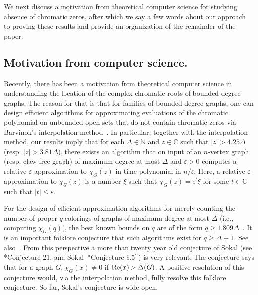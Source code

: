 \documentclass[a4paper,11pt,reqno]{amsart}
\numberwithin{equation}{section}
\begin{document}
We next discuss a motivation from theoretical computer science for studying absence of chromatic zeros, after which we say a few words about our approach to proving these results and provide an organization of the remainder of the paper.

\subsection*{Motivation from computer science.}
Recently, there has been a motivation from theoretical computer science in understanding the location of the complex chromatic roots of bounded degree graphs. 
The reason for that is that for families of bounded degree graphs, one can design efficient algorithms for approximating evaluations of the chromatic polynomial on unbounded open sets that do not contain chromatic zeros via Barvinok's interpolation method~\cites{barvinok, PR17}.
In particular, together with the interpolation method, our results imply that for each $\Delta\in \mathbb{N}$ and $z\in \mathbb{C}$ such that $|z|>4.25\Delta$ (resp. $|z|>3.81\Delta$), there exists an algorithm that on input of an $n$-vertex graph (resp. claw-free graph) of maximum degree at most $\Delta$ and $\varepsilon>0$ computes a relative $\varepsilon$-approximation to $\chi_G(z)$ in time polynomial in $n/\varepsilon$.
Here, a relative $\varepsilon$-approximation to $\chi_G(z)$ is a number $\xi$ such that $\chi_G(z)=e^{t}\xi$ for some $t\in \mathbb{C}$ such that $|t|\leq \varepsilon$.

For the design of efficient approximation algorithms for merely counting the number of proper $q$-colorings of graphs of maximum degree at most $\Delta$ (i.e., computing $\chi_G(q))$, the best known bounds on $q$ are of the form $q\geq 1.809\Delta$~\cites{carlson2025flip,chen2024deterministic}.
It is an important folklore conjecture that such algorithms exist for $q\geq \Delta+1$.
See also~\cite{FriezeVigodasurvey}.
From this perspective a more than twenty year old conjecture of Sokal (see \cite{Jackson}*{Conjecture 21}, and Sokal~\cite{Sokalsurvey}*{Conjecture 9.5$^{\prime \prime}$}) is very relevant.
The conjecture says that for a graph $G$, $\chi_G(x) \not= 0$ if ${\rm Re}(x) > \Delta(G)$. %
A positive resolution of this conjecture would, via the interpolation method, fully resolve this folklore conjecture.
So far, Sokal's conjecture is wide open.
\end{document}
